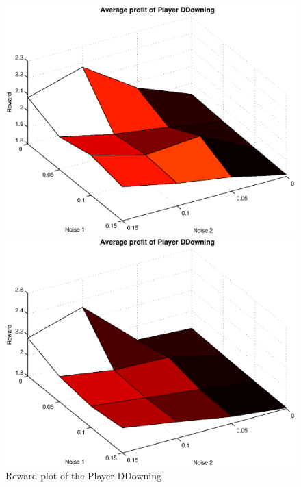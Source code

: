\documentclass[11pt,twoside]{article}
\begin{document}
\begin{figure}[h]
\begin{minipage}[hbt]{0.65\textwidth}
	\centering
	\includegraphics[width=\textwidth]{pics/simulation1/Reward_vs_Noise_of_Player_DDowning}
\end{minipage}
\hfill
\begin{minipage}[hbt]{0.3\textwidth}
	\centering
	\includegraphics[width=\textwidth]{pics/simulation2/Reward_vs_Noise_of_Player_DDowning}
\end{minipage}
	\caption{Reward plot of the Player DDowning}
	\label{pic player dd}
\end{figure}
\end{document}
